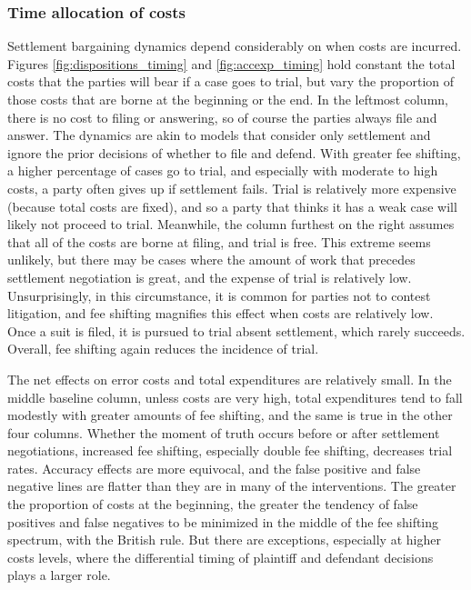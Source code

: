 \documentclass{article}
\begin{document}
\subsubsection{Time allocation of costs}

Settlement bargaining dynamics depend considerably on when costs are incurred. Figures \ref{fig:dispositions_timing} and \ref{fig:accexp_timing} hold constant the total costs that the parties will bear if a case goes to trial, but vary the proportion of those costs that are borne at the beginning or the end. In the leftmost column, there is no cost to filing or answering, so of course the parties always file and answer. The dynamics are akin to models that consider only settlement and ignore the prior decisions of whether to file and defend. With greater fee shifting, a higher percentage of cases go to trial, and especially with moderate to high costs, a party often gives up if settlement fails. Trial is relatively more expensive (because total costs are fixed), and so a party that thinks it has a weak case will likely not proceed to trial. Meanwhile, the column furthest on the right assumes that all of the costs are borne at filing, and trial is free. This extreme seems unlikely, but there may be cases where the amount of work that precedes settlement negotiation is great, and the expense of trial is relatively low. Unsurprisingly, in this circumstance, it is common for parties not to contest litigation, and fee shifting magnifies this effect when costs are relatively low. Once a suit is filed, it is pursued to trial absent settlement, which rarely succeeds. Overall, fee shifting again reduces the incidence of trial.

The net effects on error costs and total expenditures are relatively small. In the middle baseline column, unless costs are very high, total expenditures tend to fall modestly with greater amounts of fee shifting, and the same is true in the other four columns. Whether the moment of truth occurs before or after settlement negotiations, increased fee shifting, especially double fee shifting, decreases trial rates. Accuracy effects are more equivocal, and the false positive and false negative lines are flatter than they are in many of the interventions. The greater the proportion of costs at the beginning, the greater the tendency of false positives and false negatives to be minimized in the middle of the fee shifting spectrum, with the British rule. But there are exceptions, especially at higher costs levels, where the differential timing of plaintiff and defendant decisions plays a larger role. 
\end{document}
